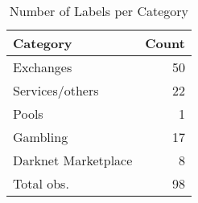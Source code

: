 \begin{table}[ht]
\centering
\begin{tabular}{lr}
  \hline
Category & Count \\ 
  \hline
Exchanges &  50 \\ 
  Services/others &  22 \\ 
  Pools &   1 \\ 
  Gambling &  17 \\ 
  Darknet Marketplace &   8 \\ 
  Total obs. &  98 \\ 
   \hline
\end{tabular}
\caption{Number of Labels per Category} 
\label{label_cat}
\end{table}
